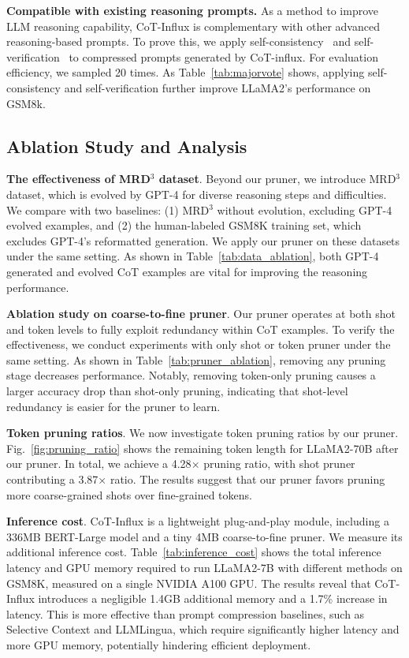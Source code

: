  \textbf{Compatible with existing reasoning prompts.}  As a method to improve LLM reasoning capability, {CoT-Influx} is complementary with other advanced reasoning-based prompts. To prove this, we apply self-consistency~\cite{selfconsistency} and self-verification~\cite{weng2023large} to compressed prompts generated by CoT-influx. For evaluation efficiency, we sampled 20 times. As  Table~\ref{tab:majorvote} shows, applying self-consistency and self-verification further improve LLaMA2's performance on GSM8k. 

\subsection{Ablation Study and Analysis}

\textbf{The effectiveness of MRD$^3$ dataset}.  Beyond our pruner, we introduce   MRD$^3$ dataset, which is evolved by GPT-4 for diverse reasoning steps and difficulties. We compare with two baselines: (1) MRD$^3$ without evolution, excluding GPT-4 evolved examples, and (2) the human-labeled GSM8K training set, which excludes  GPT-4's reformatted generation. We apply our pruner on these datasets under the same setting. As shown in  Table~\ref{tab:data_ablation},  both GPT-4 generated and evolved CoT examples are vital for improving the reasoning performance.

\textbf{Ablation study on coarse-to-fine pruner}. Our pruner operates at both shot and token levels to fully exploit redundancy within CoT examples. To verify the effectiveness, we conduct experiments with only shot or token pruner under the same setting. As shown in Table~\ref{tab:pruner_ablation}, removing any pruning stage decreases performance. Notably, removing token-only pruning causes a larger accuracy drop than shot-only pruning, indicating that shot-level redundancy is easier for the pruner to learn. 

\textbf{Token pruning ratios}. We now investigate token pruning ratios by our pruner. Fig.~\ref{fig:pruning_ratio} shows the remaining token length for LLaMA2-70B after our pruner. In total, we achieve a 4.28$\times$ pruning ratio, with shot pruner contributing a 3.87$\times$ ratio. The results  suggest that our pruner favors pruning more coarse-grained shots over fine-grained tokens. 

\textbf{Inference cost}. {CoT-Influx} is a lightweight plug-and-play module, including a 336MB BERT-Large model and a tiny 4MB coarse-to-fine pruner. We measure its additional inference cost.  
Table~\ref{tab:inference_cost} shows the total inference latency and GPU memory required to run LLaMA2-7B with different methods on GSM8K, measured on a single NVIDIA A100 GPU. The results reveal that {CoT-Influx} introduces a negligible 1.4GB additional memory and a 1.7\% increase in latency. This is more effective than prompt compression baselines, such as Selective Context and LLMLingua, which require significantly higher latency and more GPU memory, potentially hindering efficient deployment.

